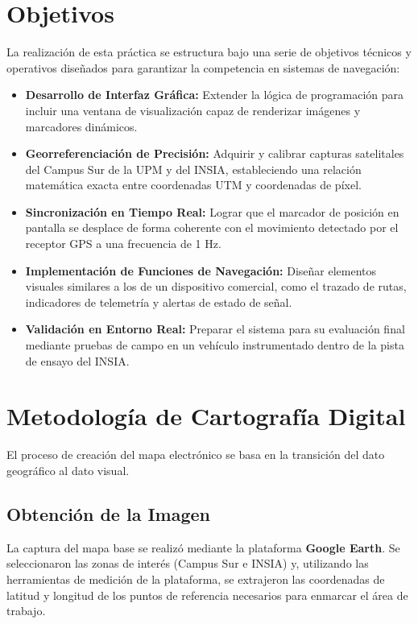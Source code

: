 \documentclass[10pt]{article}
\begin{document}
\section{Objetivos}
La realización de esta práctica se estructura bajo una serie de objetivos técnicos y operativos diseñados para garantizar la competencia en sistemas de navegación:

\begin{itemize}[leftmargin=1.2em]
    \item \textbf{Desarrollo de Interfaz Gráfica:} Extender la lógica de programación para incluir una ventana de visualización capaz de renderizar imágenes y marcadores dinámicos.
    \item \textbf{Georreferenciación de Precisión:} Adquirir y calibrar capturas satelitales del Campus Sur de la UPM y del INSIA, estableciendo una relación matemática exacta entre coordenadas UTM y coordenadas de píxel.
    \item \textbf{Sincronización en Tiempo Real:} Lograr que el marcador de posición en pantalla se desplace de forma coherente con el movimiento detectado por el receptor GPS a una frecuencia de 1 Hz.
    \item \textbf{Implementación de Funciones de Navegación:} Diseñar elementos visuales similares a los de un dispositivo comercial, como el trazado de rutas, indicadores de telemetría y alertas de estado de señal.
    \item \textbf{Validación en Entorno Real:} Preparar el sistema para su evaluación final mediante pruebas de campo en un vehículo instrumentado dentro de la pista de ensayo del INSIA.
\end{itemize}

\section{Metodología de Cartografía Digital}
El proceso de creación del mapa electrónico se basa en la transición del dato geográfico al dato visual.

\subsection{Obtención de la Imagen}
La captura del mapa base se realizó mediante la plataforma \textbf{Google Earth}. Se seleccionaron las zonas de interés (Campus Sur e INSIA) y, utilizando las herramientas de medición de la plataforma, se extrajeron las coordenadas de latitud y longitud de los puntos de referencia necesarios para enmarcar el área de trabajo.
\end{document}
